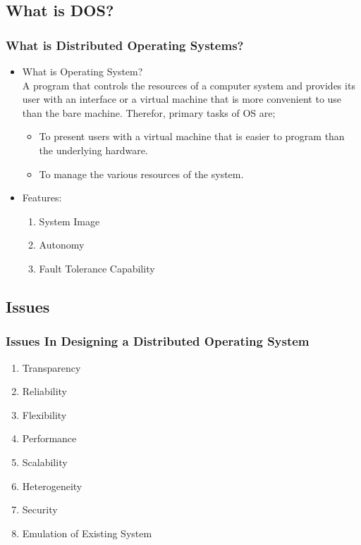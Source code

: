 \documentclass{beamer}
\begin{document}
\subsection{What is DOS?}
\begin{frame}
    \frametitle{ What is Distributed Operating Systems?}
    \begin{itemize}
      \item What is Operating System?
        \\A program that controls the resources of a computer system and provides its user with an interface or a virtual machine that is more convenient to use than the bare machine. Therefor, primary tasks of OS are;
        \begin{itemize}
          \item To present users with a virtual machine that is easier to program than the underlying hardware.
          \item To manage the various resources of the system.
        \end{itemize}
        \vspace{1cm}
      \item Features:
      \begin{enumerate}
        \item System Image
        \item Autonomy
        \item Fault Tolerance Capability
      \end{enumerate}
    \end{itemize}
\end{frame}



\subsection{Issues}
\begin{frame}
    \frametitle{Issues In Designing a Distributed Operating System}
    \begin{enumerate}
		\item Transparency 
      	\item Reliability
      	\item Flexibility
      	\item Performance
      	\item Scalability
      	\item Heterogeneity
      	\item Security
      	\item Emulation of Existing System
    \end{enumerate}  
    \vspace{3cm} 
\end{frame}   
\end{document}

